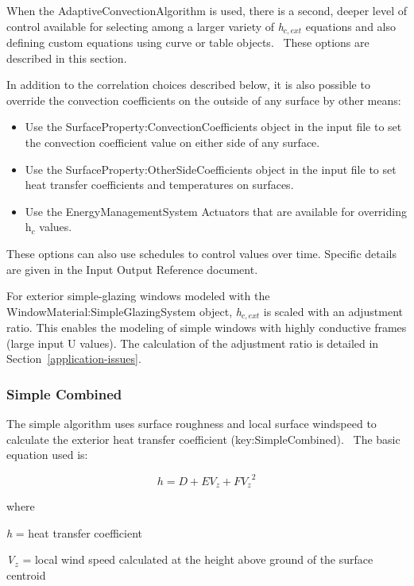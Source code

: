 When the AdaptiveConvectionAlgorithm is used, there is a second, deeper level of control available for selecting among a larger variety of \emph{h\(_{c,ext}\)} equations and also defining custom equations using curve or table objects.~ These options are described in this section.

In addition to the correlation choices described below, it is also possible to override the convection coefficients on the outside of any surface by other means:

\begin{itemize}
\item
  Use the SurfaceProperty:ConvectionCoefficients object in the input file to set the convection coefficient value on either side of any surface.
\item
  Use the SurfaceProperty:OtherSideCoefficients object in the input file to set heat transfer coefficients and temperatures on surfaces.
\item
  Use the EnergyManagementSystem Actuators that are available for overriding h\(_{c}\) values.
\end{itemize}

These options can also use schedules to control values over time. Specific details are given in the Input Output Reference document.

For exterior simple-glazing windows modeled with the WindowMaterial:SimpleGlazingSystem
object, \emph{h\(_{c,ext}\)} is scaled with an adjustment ratio. This enables the modeling
of simple windows with highly conductive frames (large input U values). The calculation
of the adjustment ratio is detailed in Section~\ref{application-issues}.

\subsubsection{Simple Combined}\label{simple-combined}

The simple algorithm uses surface roughness and local surface windspeed to calculate the exterior heat transfer coefficient (key:SimpleCombined).~ The basic equation used is:

\begin{equation}
h = D + E{V_z} + F{V_z}^2
\end{equation}

where

\emph{h} = heat transfer coefficient

\emph{V\(_{z}\)} = local wind speed calculated at the height above ground of the surface centroid

